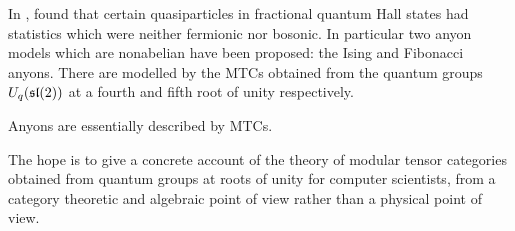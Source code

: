 
In ,  found that certain quasiparticles in fractional
quantum Hall states had statistics which were neither fermionic nor bosonic. In
particular two anyon models which are nonabelian have been proposed: the Ising
and Fibonacci anyons. There are modelled by the MTCs obtained from the quantum
groups $U_q(\mathfrak{sl}(2))$ at a fourth and fifth root of unity respectively. 

Anyons are essentially described by MTCs. 



The hope is to give a concrete account of the theory of modular tensor
categories obtained from quantum groups at roots of unity for computer
scientists, from a category theoretic and algebraic point of view rather than a
physical point of view. 


